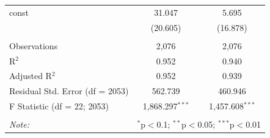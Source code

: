 \documentclass[manuscript,screen,authorversion]{acmart}
\begin{document}
\begin{table}[htbp]
\begin{tabularx}{0.92\linewidth}{@{\extracolsep{\fill}}>{\raggedright\arraybackslash}Xcc}
const & 31.047 & 5.695 \\
 & (20.605) & (16.878) \\

\hline \\[-1.8ex]
Observations & 2,076 & 2,076 \\
R$^{2}$ & 0.952 & 0.940 \\
Adjusted R$^{2}$ & 0.952 & 0.939 \\
Residual Std. Error (df = 2053) & 562.739 & 460.946 \\
F Statistic (df = 22; 2053) & 1,868.297$^{***}$ & 1,457.608$^{***}$ \\
\hline
\hline \\[-1.8ex]
\textit{Note:} & \multicolumn{2}{r}{$^{*}$p$<$0.1; $^{**}$p$<$0.05; $^{***}$p$<$0.01} \\
\end{tabularx}
\end{table}
\end{document}
